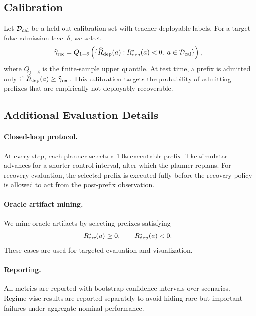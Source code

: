 \documentclass[conference]{IEEEtran}
\begin{document}
\subsection{Calibration}
\label{app:calibration}

Let $\mathcal{D}_{\rm cal}$ be a held-out calibration set with teacher deployable labels.  For a target false-admission level $\delta$, we select
\begin{equation}
    \widehat\gamma_{\rm rec}
    =
    Q_{1-\delta}
    \left(
        \{
            \widehat R_{\rm dep}(a)
            :
            R_{\rm dep}^{\star}(a)<0,
            \;
            a\in\mathcal{D}_{\rm cal}
        \}
    \right),
\end{equation}
where $Q_{1-\delta}$ is the finite-sample upper quantile.  At test time, a prefix is admitted only if $\widehat R_{\rm dep}(a)\geq\widehat\gamma_{\rm rec}$.  This calibration targets the probability of admitting prefixes that are empirically not deployably recoverable.

\subsection{Additional Evaluation Details}
\label{app:eval_details}

\paragraph{Closed-loop protocol.}
At every step, each planner selects a 1.0s executable prefix.  The simulator advances for a shorter control interval, after which the planner replans.  For recovery evaluation, the selected prefix is executed fully before the recovery policy is allowed to act from the post-prefix observation.

\paragraph{Oracle artifact mining.}
We mine oracle artifacts by selecting prefixes satisfying
\begin{equation}
    R_{\rm orc}^{\star}(a)\geq 0,
    \qquad
    R_{\rm dep}^{\star}(a)<0.
\end{equation}
These cases are used for targeted evaluation and visualization.

\paragraph{Reporting.}
All metrics are reported with bootstrap confidence intervals over scenarios.  Regime-wise results are reported separately to avoid hiding rare but important failures under aggregate nominal performance.









\end{document}
